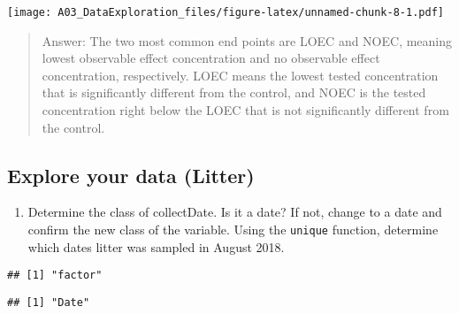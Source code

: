 \documentclass[]{article}
\newenvironment{Shaded}{\begin{snugshade}}{\end{snugshade}}
\newcommand{\CommentTok}[1]{\textcolor[rgb]{0.56,0.35,0.01}{\textit{#1}}}
\newcommand{\DataTypeTok}[1]{\textcolor[rgb]{0.13,0.29,0.53}{#1}}
\newcommand{\KeywordTok}[1]{\textcolor[rgb]{0.13,0.29,0.53}{\textbf{#1}}}
\newcommand{\NormalTok}[1]{#1}
\newcommand{\OperatorTok}[1]{\textcolor[rgb]{0.81,0.36,0.00}{\textbf{#1}}}
\newcommand{\StringTok}[1]{\textcolor[rgb]{0.31,0.60,0.02}{#1}}
\providecommand{\tightlist}{%
  \setlength{\itemsep}{0pt}\setlength{\parskip}{0pt}}
\begin{document}
\texttt{[image: A03\_DataExploration\_files/figure-latex/unnamed-chunk-8-1.pdf]}

\begin{quote}
Answer: The two most common end points are LOEC and NOEC, meaning lowest
observable effect concentration and no observable effect concentration,
respectively. LOEC means the lowest tested concentration that is
significantly different from the control, and NOEC is the tested
concentration right below the LOEC that is not significantly different
from the control.
\end{quote}

\hypertarget{explore-your-data-litter}{%
\subsection{Explore your data (Litter)}\label{explore-your-data-litter}}

\begin{enumerate}
\def\labelenumi{\arabic{enumi}.}
\setcounter{enumi}{11}
\tightlist
\item
  Determine the class of collectDate. Is it a date? If not, change to a
  date and confirm the new class of the variable. Using the
  \texttt{unique} function, determine which dates litter was sampled in
  August 2018.
\end{enumerate}

\begin{Shaded}
\end{Shaded}

\begin{verbatim}
## [1] "factor"
\end{verbatim}

\begin{Shaded}
\end{Shaded}

\begin{verbatim}
## [1] "Date"
\end{verbatim}
\end{document}
